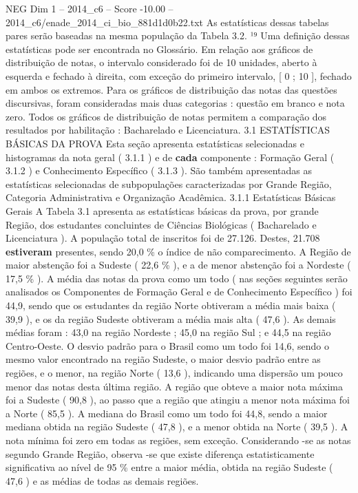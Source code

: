 \begin{textsample}{NEG Dim 1 – 2014\_c6 – Score -10.00 – 2014\_c6/enade\_2014\_ci\_bio\_881d1d0b22.txt}
As estatísticas dessas tabelas pares serão baseadas na mesma população da Tabela 3.2. ¹⁹ Uma definição dessas estatísticas pode ser encontrada no Glossário.
Em relação aos gráficos de distribuição de notas, o intervalo considerado foi de 10 unidades, aberto à esquerda e fechado à direita, com exceção do primeiro intervalo, [ 0 ; 10 ], fechado em ambos os extremos.
Para os gráficos de distribuição das notas das questões discursivas, foram consideradas mais duas categorias : questão em branco e nota zero.
Todos os gráficos de distribuição de notas permitem a comparação dos resultados por habilitação : Bacharelado e Licenciatura. 3.1 ESTATÍSTICAS BÁSICAS DA PROVA Esta seção apresenta estatísticas selecionadas e histogramas da nota geral ( 3.1.1 ) e de \textbf{cada} componente : Formação Geral ( 3.1.2 ) e Conhecimento Específico ( 3.1.3 ).
São também apresentadas as estatísticas selecionadas de subpopulações caracterizadas por Grande Região, Categoria Administrativa e Organização Acadêmica. 3.1.1 Estatísticas Básicas Gerais A Tabela 3.1 apresenta as estatísticas básicas da prova, por grande Região, dos estudantes concluintes de Ciências Biológicas ( Bacharelado e Licenciatura ).
A população total de inscritos foi de 27.126.
Destes, 21.708 \textbf{estiveram} presentes, sendo 20,0 \% o índice de não comparecimento.
A Região de maior abstenção foi a Sudeste ( 22,6 \% ), e a de menor abstenção foi a Nordeste ( 17,5 \% ).
A média das notas da prova como um todo ( nas seções seguintes serão analisados os Componentes de Formação Geral e de Conhecimento Específico ) foi 44,9, sendo que os estudantes da região Norte obtiveram a média mais baixa ( 39,9 ), e os da região Sudeste obtiveram a média mais alta ( 47,6 ).
As demais médias foram : 43,0 na região Nordeste ; 45,0 na região Sul ; e 44,5 na região Centro-Oeste.
O desvio padrão para o Brasil como um todo foi 14,6, sendo o mesmo valor encontrado na região Sudeste, o maior desvio padrão entre as regiões, e o menor, na região Norte ( 13,6 ), indicando uma dispersão um pouco menor das notas desta última região.
A região que obteve a maior nota máxima foi a Sudeste ( 90,8 ), ao passo que a região que atingiu a menor nota máxima foi a Norte ( 85,5 ).
A mediana do Brasil como um todo foi 44,8, sendo a maior mediana obtida na região Sudeste ( 47,8 ), e a menor obtida na Norte ( 39,5 ).
A nota mínima foi zero em todas as regiões, sem exceção.
Considerando -se as notas segundo Grande Região, observa -se que existe diferença estatisticamente significativa ao nível de 95 \% entre a maior média, obtida na região Sudeste ( 47,6 ) e as médias de todas as demais regiões.

\end{textsample}

